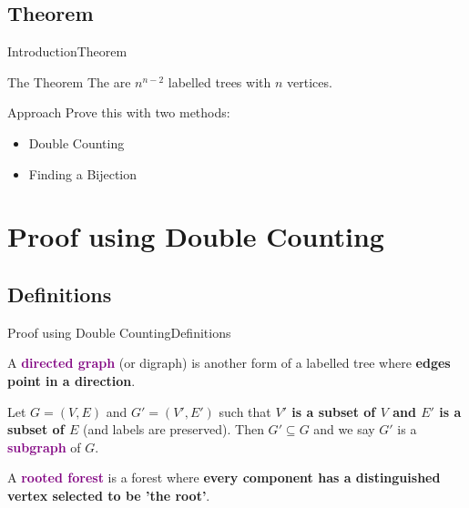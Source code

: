 \documentclass[10pt]{beamer}
\theoremstyle{definition}
\newcommand{\Sone}{Introduction}
\newcommand{\SoneSStheorem}{Theorem}
\newcommand{\Stwo}{Proof using Double Counting}
\newcommand{\StwoSSdefinitions}{Definitions}
\newcommand{\DefColor}{purple}
\begin{document}
\subsection{\SoneSStheorem}
\begin{frame}{\Sone}{\SoneSStheorem}
\begin{block}{The Theorem}
The are $n^{n-2}$ labelled trees with $n$ vertices. 
\end{block}
  
\pause 
 
\begin{block}{Approach}
Prove this with two methods:
\begin{itemize}
  \item Double Counting
  \pause
  \item Finding a Bijection
\end{itemize}
\end{block}
  
\end{frame}

\section{\Stwo}
\subsection{\StwoSSdefinitions}
\begin{frame}{\Stwo}{\StwoSSdefinitions}
\begin{definition}
A \textbf{\textcolor{\DefColor}{directed graph}} (or digraph) is another form of a labelled tree where \textbf{edges point in a direction}.
\end{definition}

\pause

\begin{definition}
Let $G=(V,E)$ and $G'=(V',E')$ such that \textbf{$V'$ is a subset of $V$ and $E'$ is a subset of $E$} (and labels are preserved). Then $G'\subseteq G$ and we say $G'$ is a \textbf{\textcolor{\DefColor}{subgraph}} of $G$.
\end{definition}

\pause

\begin{definition}
A \textbf{\textcolor{\DefColor}{rooted forest}} is a forest where \textbf{every component has a distinguished vertex selected to be 'the root'}.
\end{definition}
  
\end{frame}
\end{document}
